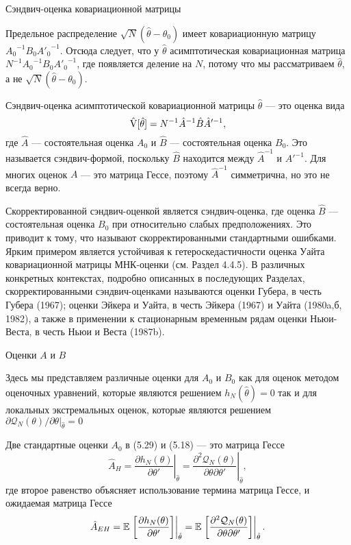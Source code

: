 \begin{center}
Сэндвич-оценка ковариационной матрицы
\end{center}

Предельное распределение $\sqrt{N}(\hat{\theta}-\theta_0)$ имеет ковариационную матрицу ${A_0}^{-1} B_0 {A'_0}^{-1}$. Отсюда следует, что у $\hat{\theta}$ асимптотическая ковариационная матрица $N^{-1}{A_0}^{-1} B_0 {A'_0}^{-1}$, где появляется деление на $N$, потому что мы рассматриваем $\hat{\theta}$, а не $\sqrt{N}(\hat{\theta}-\theta_0)$.

Сэндвич-оценка асимптотической ковариационной матрицы $\hat{\theta}$ --- это оценка вида
\begin{equation}
\hat{\mathrm{V}}[\hat{\theta}]= N^{-1} \hat{A}^{-1} \hat{B} \hat{A}'^{-1},
\end{equation}
где $\hat{A}$ --- состоятельная оценка $A_0$ и $\hat{B}$ --- состоятельная оценка $B_0$. Это называется сэндвич-формой, поскольку $\hat{B}$ находится между $\hat{A}^{-1}$ и $\hat{A}'^{-1}$. Для многих оценок $A$ --- это матрица Гессе, поэтому $\hat{A}^{-1}$ симметрична, но это не всегда верно.

Скорректированной сэндвич-оценкой является сэндвич-оценка, где оценка $\hat{B}$ --- состоятельная оценка $B_0$ при относительно слабых предположениях. Это приводит к тому, что называют скорректированными стандартными ошибками. Ярким примером является устойчивая к гетероскедастичности оценка Уайта ковариационной матрицы МНК-оценки (см. Раздел 4.4.5). В различных конкретных контекстах, подробно описанных в последующих Разделах, скорректированными сэндвич-оценками называются оценки Губера, в честь Губера (1967); оценки Эйкера и Уайта, в честь Эйкера (1967) и Уайта (1980a,б, 1982), а также в применении к стационарным временным рядам оценки Ньюи-Веста, в честь Ньюи и Веста (1987b).

\begin{center}
Оценки $A$ и $B$
\end{center}

Здесь мы представляем различные оценки для $A_0$ и $B_0$ как для оценок методом оценочных уравнений, которые являются решением $h_{N}(\hat{\theta})=0$ так и для локальных экстремальных оценок, которые являются решением $\partial \mathcal{Q}_N(\theta) / \partial \theta |_{\hat{\theta}}=0 $

Две стандартные оценки $A_0$ в (5.29) и (5.18) --- это матрица Гессе
\begin{equation}
\hat{A}_H=\left. \frac{\partial h_{N}(\theta)}{\partial \theta'} \right|_{\hat{\theta}}= \left. \frac{\partial^2 \mathcal{Q}_N(\theta)}{\partial \theta \partial \theta'} \right|_{\hat{\theta}},
\end{equation}
где второе равенство объясняет использование термина матрица Гессе, и ожидаемая матрица Гессе
\begin{equation}
\hat{A}_{EH}=\mathbb{E} \left. \left[ \frac{\partial h_{N}(\theta)}{\partial \theta'}\right] \right|_{\hat{\theta}}= \mathbb{E} \left. \left[ \frac{\partial^2 \mathcal{Q}_N(\theta)}{\partial \theta \partial \theta'} \right] \right|_{\hat{\theta}}.
\end{equation}

